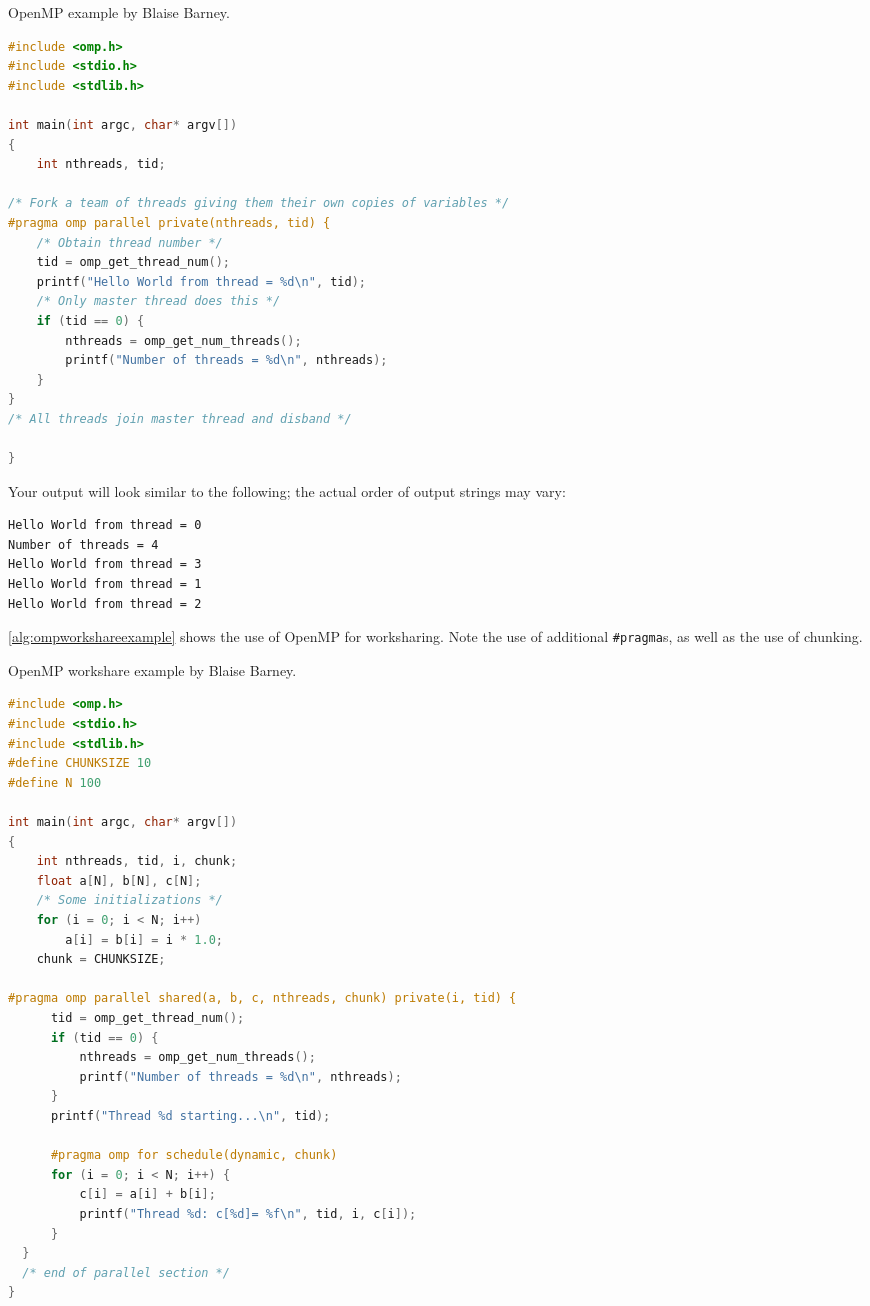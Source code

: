 \begin{algorithm}[h]
\caption{OpenMP example by Blaise Barney.}
\label{alg:ompexample}
\begin{lstlisting}[language=c]
#include <omp.h>
#include <stdio.h>
#include <stdlib.h>

int main(int argc, char* argv[])
{
    int nthreads, tid;

/* Fork a team of threads giving them their own copies of variables */
#pragma omp parallel private(nthreads, tid) {
    /* Obtain thread number */
    tid = omp_get_thread_num();
    printf("Hello World from thread = %d\n", tid);
    /* Only master thread does this */
    if (tid == 0) {
        nthreads = omp_get_num_threads();
        printf("Number of threads = %d\n", nthreads);
    }
}
/* All threads join master thread and disband */

}
\end{lstlisting}
\end{algorithm}



Your output will look similar to the following; the actual order of output strings may vary:
\begin{lstlisting}
Hello World from thread = 0 
Number of threads = 4 
Hello World from thread = 3 
Hello World from thread = 1 
Hello World from thread = 2  
\end{lstlisting}

\autoref{alg:ompworkshareexample} shows the use of OpenMP for worksharing. Note the use of additional \texttt{\#pragma}s, as well as the use of chunking.

\begin{algorithm}[H]
\caption{OpenMP workshare example by Blaise Barney.}
\label{alg:ompworkshareexample}
\begin{lstlisting}[language=c]
#include <omp.h>
#include <stdio.h>
#include <stdlib.h>
#define CHUNKSIZE 10
#define N 100

int main(int argc, char* argv[])
{
    int nthreads, tid, i, chunk;
    float a[N], b[N], c[N];
    /* Some initializations */
    for (i = 0; i < N; i++)
        a[i] = b[i] = i * 1.0;
    chunk = CHUNKSIZE;

#pragma omp parallel shared(a, b, c, nthreads, chunk) private(i, tid) {
      tid = omp_get_thread_num();
      if (tid == 0) {
          nthreads = omp_get_num_threads();
          printf("Number of threads = %d\n", nthreads);
      }
      printf("Thread %d starting...\n", tid);

      #pragma omp for schedule(dynamic, chunk)
      for (i = 0; i < N; i++) {
          c[i] = a[i] + b[i];
          printf("Thread %d: c[%d]= %f\n", tid, i, c[i]);
      }
  }
  /* end of parallel section */
}
\end{lstlisting}
\end{algorithm}

